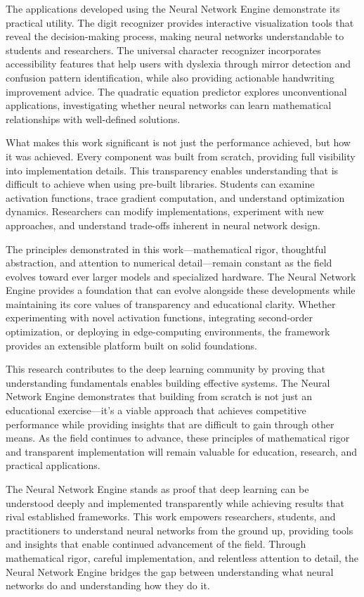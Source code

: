 \documentclass[11pt,a4paper]{report}
\begin{document}
The applications developed using the Neural Network Engine demonstrate its practical utility. The digit recognizer provides interactive visualization tools that reveal the decision-making process, making neural networks understandable to students and researchers. The universal character recognizer incorporates accessibility features that help users with dyslexia through mirror detection and confusion pattern identification, while also providing actionable handwriting improvement advice. The quadratic equation predictor explores unconventional applications, investigating whether neural networks can learn mathematical relationships with well-defined solutions.

What makes this work significant is not just the performance achieved, but how it was achieved. Every component was built from scratch, providing full visibility into implementation details. This transparency enables understanding that is difficult to achieve when using pre-built libraries. Students can examine activation functions, trace gradient computation, and understand optimization dynamics. Researchers can modify implementations, experiment with new approaches, and understand trade-offs inherent in neural network design.

The principles demonstrated in this work—mathematical rigor, thoughtful abstraction, and attention to numerical detail—remain constant as the field evolves toward ever larger models and specialized hardware. The Neural Network Engine provides a foundation that can evolve alongside these developments while maintaining its core values of transparency and educational clarity. Whether experimenting with novel activation functions, integrating second-order optimization, or deploying in edge-computing environments, the framework provides an extensible platform built on solid foundations.

This research contributes to the deep learning community by proving that understanding fundamentals enables building effective systems. The Neural Network Engine demonstrates that building from scratch is not just an educational exercise—it's a viable approach that achieves competitive performance while providing insights that are difficult to gain through other means. As the field continues to advance, these principles of mathematical rigor and transparent implementation will remain valuable for education, research, and practical applications.

The Neural Network Engine stands as proof that deep learning can be understood deeply and implemented transparently while achieving results that rival established frameworks. This work empowers researchers, students, and practitioners to understand neural networks from the ground up, providing tools and insights that enable continued advancement of the field. Through mathematical rigor, careful implementation, and relentless attention to detail, the Neural Network Engine bridges the gap between understanding what neural networks do and understanding how they do it.
\end{document}
